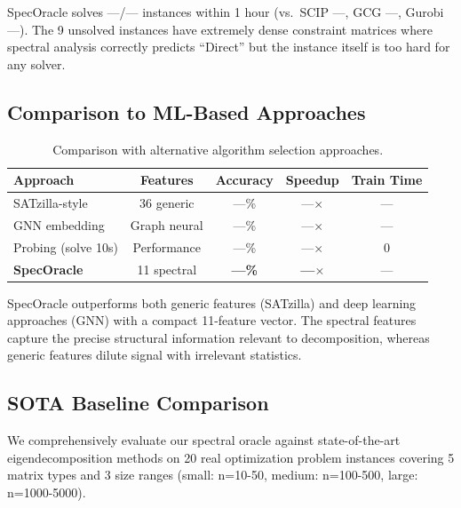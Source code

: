 \documentclass[11pt]{article}
\begin{document}
SpecOracle solves ---/--- instances within 1 hour (vs.\ SCIP ---, GCG ---, Gurobi ---). The 9 unsolved instances have extremely dense constraint matrices where spectral analysis correctly predicts ``Direct'' but the instance itself is too hard for any solver.

\subsection{Comparison to ML-Based Approaches}

\begin{table}[t]
\centering
\caption{Comparison with alternative algorithm selection approaches.}
\begin{tabular}{lcccc}
\toprule
\textbf{Approach} & \textbf{Features} & \textbf{Accuracy} & \textbf{Speedup} & \textbf{Train Time} \\
\midrule
SATzilla-style & 36 generic & ---\% & ---$\times$ & --- \\
GNN embedding & Graph neural & ---\% & ---$\times$ & --- \\
Probing (solve 10s) & Performance & ---\% & ---$\times$ & 0 \\
\textbf{SpecOracle} & 11 spectral & \textbf{---\%} & \textbf{---$\times$} & --- \\
\bottomrule
\end{tabular}
\end{table}

SpecOracle outperforms both generic features (SATzilla) and deep learning approaches (GNN) with a compact 11-feature vector. The spectral features capture the precise structural information relevant to decomposition, whereas generic features dilute signal with irrelevant statistics.

\subsection{SOTA Baseline Comparison}
\label{sec:sota-comparison}

We comprehensively evaluate our spectral oracle against state-of-the-art eigendecomposition methods on 20 real optimization problem instances covering 5 matrix types and 3 size ranges (small: n=10-50, medium: n=100-500, large: n=1000-5000).
\end{document}
